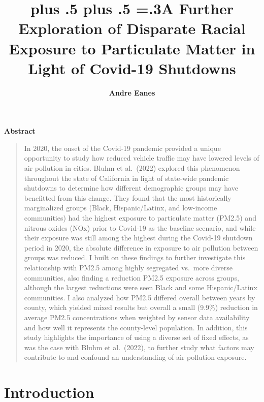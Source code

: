 \documentclass[12pt, ]{article}
\title{\sffamily\bfseries\huge\parfillskip=0pt
\rightskip=0pt plus .5\textwidth
\leftskip=0pt plus .5\textwidth
\emergencystretch=.3\textwidth A Further Exploration of Disparate Racial
Exposure to Particulate Matter in Light of Covid-19 Shutdowns}
\author{\textbf{Andre Eanes}
 }
\date{}
\renewenvironment{abstract}{
  \centerline
  {\large\sffamily\bfseries Abstract}\vspace{-1em}
  \begin{quote}\small
}{
  \end{quote}
}
\begin{document}
\allsectionsfont{\sffamily}

\maketitle

\begin{abstract}
In 2020, the onset of the Covid-19 pandemic provided a unique
opportunity to study how reduced vehicle traffic may have lowered levels
of air pollution in cities. Bluhm et al.~(2022) explored this phenomenon
throughout the state of California in light of state-wide pandemic
shutdowns to determine how different demographic groups may have
benefitted from this change. They found that the most historically
marginalized groups (Black, Hispanic/Latinx, and low-income communities)
had the highest exposure to particulate matter (PM2.5) and nitrous
oxides (NOx) prior to Covid-19 as the baseline scenario, and while their
exposure was still among the highest during the Covid-19 shutdown period
in 2020, the absolute difference in exposure to air pollution between
groups was reduced. I built on these findings to further investigate
this relationship with PM2.5 among highly segregated vs.~more diverse
communities, also finding a reduction PM2.5 exposure across groups,
although the largest reductions were seen Black and some Hispanic/Latinx
communities. I also analyzed how PM2.5 differed overall between years by
county, which yielded mixed results but overall a small (9.9\%)
reduction in average PM2.5 concentrations when weighted by sensor data
availability and how well it represents the county-level population. In
addition, this study highlights the importance of using a diverse set of
fixed effects, as was the case with Bluhm et al.~(2022), to further
study what factors may contribute to and confound an understanding of
air pollution exposure.
\end{abstract}

\ifdefined\Shaded\renewenvironment{Shaded}{\begin{tcolorbox}[frame hidden, borderline west={3pt}{0pt}{shadecolor}, breakable, interior hidden, sharp corners, boxrule=0pt, enhanced]}{\end{tcolorbox}}\fi




\hypertarget{introduction}{%
\section{Introduction}\label{introduction}}
\end{document}
